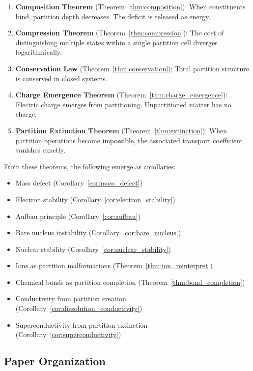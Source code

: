 \documentclass[twocolumn,10pt,a4paper]{article}
\theoremstyle{definition}
\theoremstyle{remark}
\begin{document}
\begin{enumerate}
    \item \textbf{Composition Theorem} (Theorem~\ref{thm:composition}): When constituents bind, partition depth decreases. The deficit is released as energy.

    \item \textbf{Compression Theorem} (Theorem~\ref{thm:compression}): The cost of distinguishing multiple states within a single partition cell diverges logarithmically.

    \item \textbf{Conservation Law} (Theorem~\ref{thm:conservation}): Total partition structure is conserved in closed systems.

    \item \textbf{Charge Emergence Theorem} (Theorem~\ref{thm:charge_emergence}): Electric charge emerges from partitioning. Unpartitioned matter has no charge.

    \item \textbf{Partition Extinction Theorem} (Theorem~\ref{thm:extinction}): When partition operations become impossible, the associated transport coefficient vanishes exactly.
\end{enumerate}

From these theorems, the following emerge as corollaries:
\begin{itemize}
    \item Mass defect (Corollary~\ref{cor:mass_defect})
    \item Electron stability (Corollary~\ref{cor:electron_stability})
    \item Aufbau principle (Corollary~\ref{cor:aufbau})
    \item Bare nucleus instability (Corollary~\ref{cor:bare_nucleus})
    \item Nuclear stability (Corollary~\ref{cor:nuclear_stability})
    \item Ions as partition malformations (Theorem~\ref{thm:ion_reinterpret})
    \item Chemical bonds as partition completion (Theorem~\ref{thm:bond_completion})
    \item Conductivity from partition creation (Corollary~\ref{cor:dissolution_conductivity})
    \item Superconductivity from partition extinction (Corollary~\ref{cor:superconductivity})
\end{itemize}

\subsection{Paper Organization}
\end{document}
